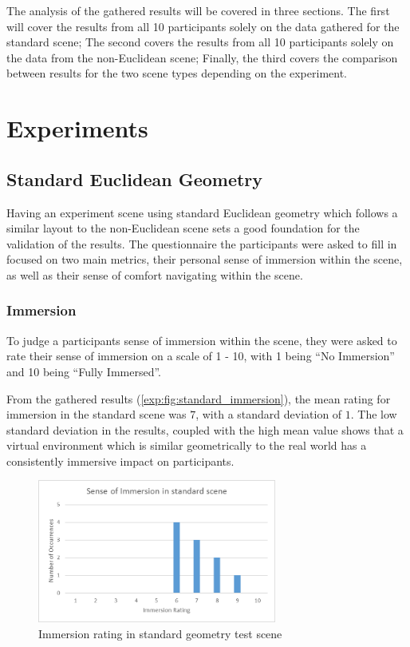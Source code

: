 		The analysis of the gathered results will be covered in three sections. The first will cover the results from all 10 participants solely on the data gathered for the standard scene; The second covers the results from all 10 participants solely on the data from the non-Euclidean scene; Finally, the third covers the comparison between results for the two scene types depending on the experiment. %


	\section{Experiments}
	\label{exp:exp}

		\subsection{Standard Euclidean Geometry}
		\label{exp:exp:standard}

			Having an experiment scene using standard Euclidean geometry which follows a similar layout to the non-Euclidean scene sets a good foundation for the validation of the results. %
			The questionnaire the participants were asked to fill in focused on two main metrics, their personal sense of immersion within the scene, as well as their sense of comfort navigating within the scene.

			\subsubsection{Immersion}

				To judge a participants sense of immersion within the scene, they were asked to rate their sense of immersion on a scale of 1 - 10, with 1 being \enquote{No Immersion} and 10 being \enquote{Fully Immersed}.

				From the gathered results (\autoref{exp:fig:standard_immersion}), the mean rating for immersion in the standard scene was $7$, with a standard deviation of $1$.
				The low standard deviation in the results, coupled with the high mean value shows that a virtual environment which is similar geometrically to the real world has a consistently immersive impact on participants.

				\begin{figure}[h]
					\includegraphics[width=0.7\textwidth]{Images/Standard_Immersion}
					\centering
					\caption{Immersion rating in standard geometry test scene}
					\label{exp:fig:standard_immersion}
				\end{figure}

